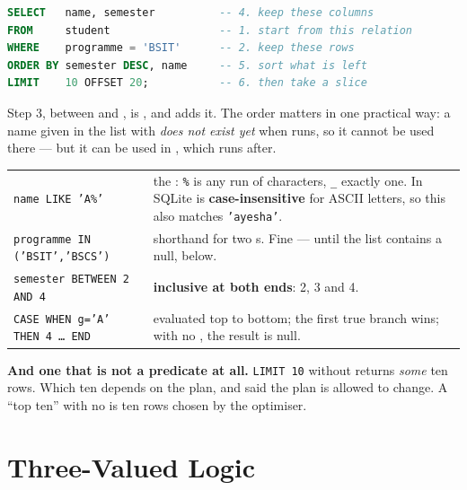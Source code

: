 \begin{definitionbox}
\begin{lstlisting}[language=sql]
SELECT   name, semester          -- 4. keep these columns
FROM     student                 -- 1. start from this relation
WHERE    programme = 'BSIT'      -- 2. keep these rows
ORDER BY semester DESC, name     -- 5. sort what is left
LIMIT    10 OFFSET 20;           -- 6. then take a slice
\end{lstlisting}

\smallskip
Step 3, between  and , is , and
 adds it. The order matters in one practical way: a name given
in the  list with  \emph{does not exist yet} when
 runs, so it cannot be used there --- but it can be used in
, which runs after.
\end{definitionbox}

\begin{examplebox}
\begin{tabular}{@{}L{4.6cm}L{9.4cm}@{}}
\texttt{name LIKE 'A\%'} & the : \texttt{\%} is any run of characters,
  \texttt{\_} exactly one. In SQLite  is \textbf{case-insensitive}
  for ASCII letters, so this also matches \texttt{'ayesha'}. \\
\texttt{programme IN ('BSIT','BSCS')} & shorthand for two s. Fine
  --- until the list contains a null, below. \\
\texttt{semester BETWEEN 2 AND 4} & \textbf{inclusive at both ends}: 2, 3 and
  4. \\
\texttt{CASE WHEN g='A' THEN 4 \dots\ END} & evaluated top to bottom; the
  first true branch wins; with no , the result is null. \\
\end{tabular}

\smallskip
\textbf{And one that is not a predicate at all.} \texttt{LIMIT 10} without
 returns \emph{some} ten rows. Which ten depends on the plan,
and  said the plan is allowed to change. A ``top ten'' with
no  is ten rows chosen by the optimiser.
\end{examplebox}

\section{Three-Valued Logic}

